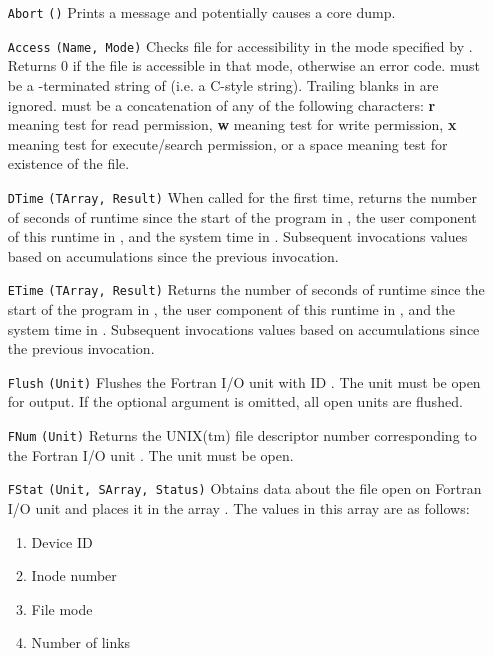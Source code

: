 \begin{itemize}
  \item[\tt Abort]{\tt ()}
    Prints a message and potentially causes a core dump.
  \item[\tt Access]{\tt (Name, Mode)}
    Checks file  for accessibility in the mode specified by
    .  Returns $0$ if the file is accessible in that mode,
    otherwise an error code.   must be a -terminated
    string of  (i.e. a C-style string).  Trailing blanks
    in  are ignored.
     must be a concatenation of any of the following characters:
    {\bf r} meaning test for read permission, {\bf w} meaning test for write
    permission, {\bf x} meaning test for execute/search permission, or
    a space meaning test for existence of the file.
  \item[\tt DTime]{\tt (TArray, Result)}
    When called for the first time, returns the number of seconds of runtime
    since the start of the program in , the user component of
    this runtime in , and the system time in .
    Subsequent invocations values based on accumulations since the previous
    invocation.
  \item[\tt ETime]{\tt (TArray, Result)}
    Returns the number of seconds of runtime since the start of the program
    in , the user component of
    this runtime in , and the system time in .
    Subsequent invocations values based on accumulations since the previous
    invocation.
  \item[\tt Flush]{\tt (Unit)}
    Flushes the Fortran I/O unit with ID .  The unit must be open
    for output. If the optional  argument is omitted, all open
    units are flushed.
  \item[\tt FNum]{\tt (Unit)}
    Returns the UNIX(tm) file descriptor number corresponding to the Fortran
    I/O unit .  The unit must be open.
  \item[\tt FStat]{\tt (Unit, SArray, Status)}
    Obtains data about the file open on Fortran I/O unit  and
    places it in the array . The values in this array are
    as follows:
    \begin{enumerate}
      \item Device ID 
      \item Inode number 
      \item File mode 
      \item Number of links 

\end{enumerate}
\end{itemize}

